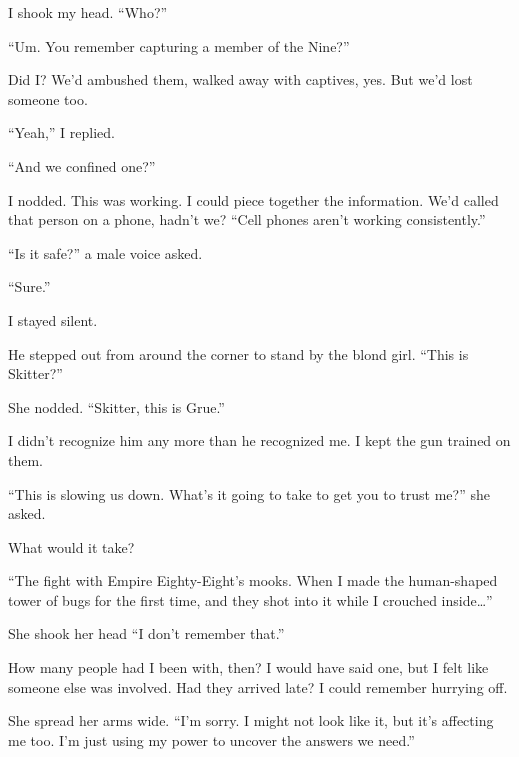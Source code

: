 I shook my head.  ``Who?''



``Um.  You remember capturing a member of the Nine?''



Did I?  We'd ambushed them, walked away with captives, yes.  But we'd lost someone too.



``Yeah,'' I replied.



``And we confined one?''



I nodded.  This was working.  I could piece together the information.  We'd called that person on a phone, hadn't we?  ``Cell phones aren't working consistently.''



``Is it safe?'' a male voice asked.



``Sure.''



I stayed silent.



He stepped out from around the corner to stand by the blond girl.  ``This is Skitter?''



She nodded.  ``Skitter, this is Grue.''



I didn't recognize him any more than he recognized me.  I kept the gun trained on them.



``This is slowing us down.  What's it going to take to get you to trust me?'' she asked.



What would it take?



``The fight with Empire Eighty-Eight's mooks.  When I made the human-shaped tower of bugs for the first time, and they shot into it while I crouched inside\ldots''



She shook her head ``I don't remember that.''



How many people had I been with, then?  I would have said one, but I felt like someone else was involved.  Had they arrived late?  I could remember hurrying off.



She spread her arms wide.  ``I'm sorry.  I might not look like it, but it's affecting me too.  I'm just using my power to uncover the answers we need.''



